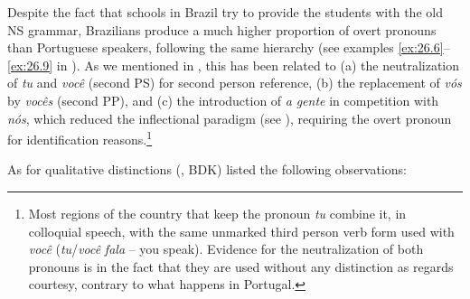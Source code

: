 \documentclass[output=paper]{langsci/langscibook}
\begin{document}
Despite the fact that schools in Brazil try to
provide the students with the old NS grammar, Brazilians produce a much higher
proportion of overt pronouns than Portuguese speakers, following the same
hierarchy (see examples \ref{ex:26.6}--\ref{ex:26.9} in
). As we mentioned in , this has
been related to (a) the neutralization of \emph{tu} and \emph{você} (second PS)
for second person reference, (b) the replacement of \emph{vós} by \emph{vocês}
(second PP), and (c) the introduction of \emph{a} \emph{gente}  in competition
with \emph{nós}, which reduced the inflectional paradigm (see
), requiring the overt pronoun for identification
reasons.\footnote{Most regions of the country that keep the pronoun \emph{tu}
    combine it, in colloquial speech, with the same unmarked third person verb
    form used with \emph{você} (\emph{tu}/\emph{você} \emph{fala} – you speak).
    Evidence for the neutralization of both pronouns is in the fact that they
    are used without any distinction as regards courtesy, contrary to what
happens in Portugal.}

As for qualitative distinctions \citeauthor{BarbosaDuarteKato2005}
(\citeyear[19]{BarbosaDuarteKato2005}, BDK) listed the following observations:
\end{document}
